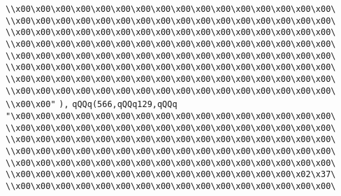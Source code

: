 \verb|\\x00\x00\x00\x00\x00\x00\x00\x00\x00\x00\x00\x00\x00\x00\x00\x00\|\newline
\verb|\\x00\x00\x00\x00\x00\x00\x00\x00\x00\x00\x00\x00\x00\x00\x00\x00\|\newline
\verb|\\x00\x00\x00\x00\x00\x00\x00\x00\x00\x00\x00\x00\x00\x00\x00\x00\|\newline
\verb|\\x00\x00\x00\x00\x00\x00\x00\x00\x00\x00\x00\x00\x00\x00\x00\x00\|\newline
\verb|\\x00\x00\x00\x00\x00\x00\x00\x00\x00\x00\x00\x00\x00\x00\x00\x00\|\newline
\verb|\\x00\x00\x00\x00\x00\x00\x00\x00\x00\x00\x00\x00\x00\x00\x00\x00\|\newline
\verb|\\x00\x00\x00\x00\x00\x00\x00\x00\x00\x00\x00\x00\x00\x00\x00\x00\|\newline
\verb|\\x00\x00\x00\x00\x00\x00\x00\x00\x00\x00\x00\x00\x00\x00\x00\x00\|\newline
\verb|\\x00\x00"|\newline
\verb|),|\newline
\verb|qQQq(566,qQQq129,qQQq|\newline
\verb|"\x00\x00\x00\x00\x00\x00\x00\x00\x00\x00\x00\x00\x00\x00\x00\x00\|\newline
\verb|\\x00\x00\x00\x00\x00\x00\x00\x00\x00\x00\x00\x00\x00\x00\x00\x00\|\newline
\verb|\\x00\x00\x00\x00\x00\x00\x00\x00\x00\x00\x00\x00\x00\x00\x00\x00\|\newline
\verb|\\x00\x00\x00\x00\x00\x00\x00\x00\x00\x00\x00\x00\x00\x00\x00\x00\|\newline
\verb|\\x00\x00\x00\x00\x00\x00\x00\x00\x00\x00\x00\x00\x00\x00\x00\x00\|\newline
\verb|\\x00\x00\x00\x00\x00\x00\x00\x00\x00\x00\x00\x00\x00\x00\x02\x37\|\newline
\verb|\\x00\x00\x00\x00\x00\x00\x00\x00\x00\x00\x00\x00\x00\x00\x00\x00\|\newline
